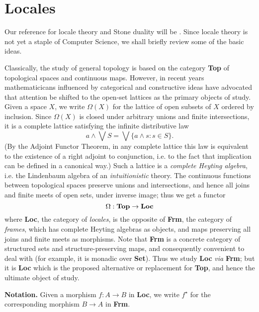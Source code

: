 \section{Locales}
Our reference for locale theory and Stone duality will be \cite{Joh82}.
Since locale theory is not yet a staple of Computer Science, we shall briefly review some of the basic ideas.

Classically, the study of general topology is based on the category {\bf Top} of topological spaces and continuous maps.
However, in recent years mathematicicans influenced by categorical and constructive ideas have advocated that attention be shifted to the open-set lattices as the primary objects of study.
Given a space $X$, we write $\Omega (X)$ for the lattice of open subsets of $X$ ordered by inclusion.
Since $\Omega (X)$ is closed under arbitrary unions and finite intersections, it is a complete lattice satisfying the infinite distributive law
\[ a \wedge \bigvee S = \bigvee \{ a \wedge s : s \in S \} . \]
(By the Adjoint Functor Theorem, in any complete lattice this law is equivalent to the existence of a right adjoint to conjunction, i.e. to the fact that implication can be defined in a canonical way.)
Such a lattice is a {\em complete Heyting algebra}, i.e. the Lindenbaum algebra of an {\em intuitionistic} theory.
The continuous functions  between topological spaces preserve unions and intersections, and hence  all joins and finite meets of open sets, under inverse image; thus we get a functor
\[ \Omega : {\bf Top} \rightarrow {\bf Loc} \]
where {\bf Loc}, the category of {\em locales}, is the opposite of {\bf Frm}, the category of {\em frames}, which has complete Heyting algebras as objects, and maps preserving all joins and finite meets as morphisms.
Note that {\bf Frm} is a concrete category of structured sets and structure-preserving maps, and consequently convenient to deal with (for example, it is monadic over {\bf Set}).
Thus we study {\bf Loc} {\it via} {\bf Frm}; but it is {\bf Loc} which is the proposed alternative or replacement for {\bf Top}, and hence the ultimate object of study.

{\bf Notation.} Given a morphism $f : A \rightarrow B$ in {\bf Loc}, we write $f^{\star}$ for the corresponding morphism $B \rightarrow A$ in {\bf Frm}.

